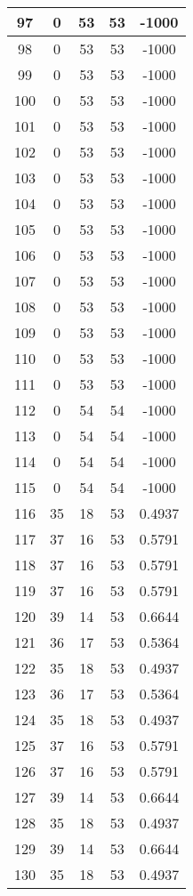\documentclass[letterpaper, 12pt]{article}
\begin{document}
\begin{longtable}{|c|c|c|c|c|}
\hline
97 & 0 & 53 & 53 & -1000 \\
\hline
98 & 0 & 53 & 53 & -1000 \\
\hline
99 & 0 & 53 & 53 & -1000 \\
\hline
100 & 0 & 53 & 53 & -1000 \\
\hline
101 & 0 & 53 & 53 & -1000 \\
\hline
102 & 0 & 53 & 53 & -1000 \\
\hline
103 & 0 & 53 & 53 & -1000 \\
\hline
104 & 0 & 53 & 53 & -1000 \\
\hline
105 & 0 & 53 & 53 & -1000 \\
\hline
106 & 0 & 53 & 53 & -1000 \\
\hline
107 & 0 & 53 & 53 & -1000 \\
\hline
108 & 0 & 53 & 53 & -1000 \\
\hline
109 & 0 & 53 & 53 & -1000 \\
\hline
110 & 0 & 53 & 53 & -1000 \\
\hline
111 & 0 & 53 & 53 & -1000 \\
\hline
112 & 0 & 54 & 54 & -1000 \\
\hline
113 & 0 & 54 & 54 & -1000 \\
\hline
114 & 0 & 54 & 54 & -1000 \\
\hline
115 & 0 & 54 & 54 & -1000 \\
\hline
116 & 35 & 18 & 53 & 0.4937 \\
\hline
117 & 37 & 16 & 53 & 0.5791 \\
\hline
118 & 37 & 16 & 53 & 0.5791 \\
\hline
119 & 37 & 16 & 53 & 0.5791 \\
\hline
120 & 39 & 14 & 53 & 0.6644 \\
\hline
121 & 36 & 17 & 53 & 0.5364 \\
\hline
122 & 35 & 18 & 53 & 0.4937 \\
\hline
123 & 36 & 17 & 53 & 0.5364 \\
\hline
124 & 35 & 18 & 53 & 0.4937 \\
\hline
125 & 37 & 16 & 53 & 0.5791 \\
\hline
126 & 37 & 16 & 53 & 0.5791 \\
\hline
127 & 39 & 14 & 53 & 0.6644 \\
\hline
128 & 35 & 18 & 53 & 0.4937 \\
\hline
129 & 39 & 14 & 53 & 0.6644 \\
\hline
130 & 35 & 18 & 53 & 0.4937 \\

\end{longtable}
\end{document}
